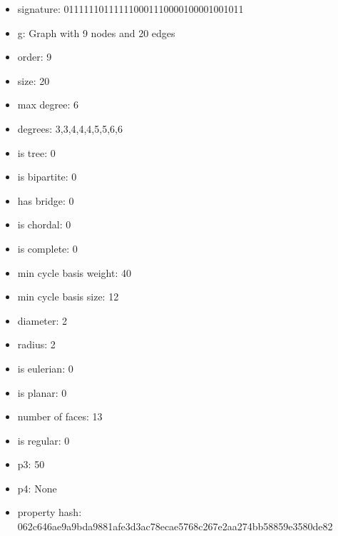 \newpage
\begin{figure}
\end{figure}
\begin{itemize}
\item signature: 011111101111110001110000100001001011
\item g: Graph with 9 nodes and 20 edges
\item order: 9
\item size: 20
\item max degree: 6
\item degrees: 3,3,4,4,4,5,5,6,6
\item is tree: 0
\item is bipartite: 0
\item has bridge: 0
\item is chordal: 0
\item is complete: 0
\item min cycle basis weight: 40
\item min cycle basis size: 12
\item diameter: 2
\item radius: 2
\item is eulerian: 0
\item is planar: 0
\item number of faces: 13
\item is regular: 0
\item p3: 50
\item p4: None
\item property hash: 062c646ae9a9bda9881afe3d3ac78ecae5768c267e2aa274bb58859e3580de82
\end{itemize}
